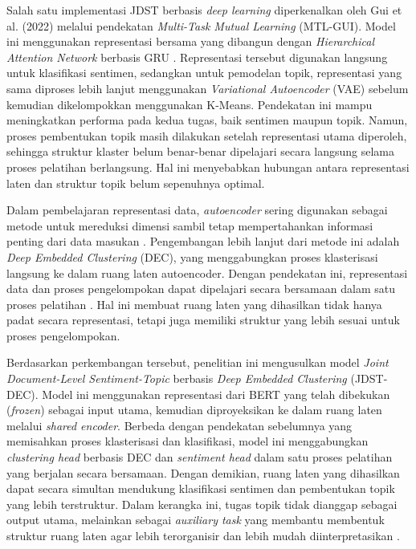 \bigskip

Salah satu implementasi JDST berbasis \textit{deep learning} diperkenalkan oleh
Gui et al. (2022) melalui pendekatan \textit{Multi-Task Mutual Learning}
(MTL-GUI). Model ini menggunakan representasi bersama yang dibangun dengan
\textit{Hierarchical Attention Network} berbasis GRU
\parencite{chung2014empirical}. Representasi tersebut digunakan langsung untuk
klasifikasi sentimen, sedangkan untuk pemodelan topik, representasi yang sama
diproses lebih lanjut menggunakan \textit{Variational Autoencoder} (VAE)
sebelum kemudian dikelompokkan menggunakan K-Means. Pendekatan ini mampu
meningkatkan performa pada kedua tugas, baik sentimen maupun topik. Namun,
proses pembentukan topik masih dilakukan setelah representasi utama diperoleh,
sehingga struktur klaster belum benar-benar dipelajari secara langsung selama
proses pelatihan berlangsung. Hal ini menyebabkan hubungan antara representasi
laten dan struktur topik belum sepenuhnya optimal.

\bigskip

Dalam pembelajaran representasi data, \textit{autoencoder} sering digunakan
sebagai metode untuk mereduksi dimensi sambil tetap mempertahankan informasi
penting dari data masukan \parencite{hinton2006reducing}. Pengembangan lebih
lanjut dari metode ini adalah \textit{Deep Embedded Clustering} (DEC), yang
menggabungkan proses klasterisasi langsung ke dalam ruang laten autoencoder.
Dengan pendekatan ini, representasi data dan proses pengelompokan dapat
dipelajari secara bersamaan dalam satu proses pelatihan
\parencite{xie2016unsupervised}. Hal ini membuat ruang laten yang dihasilkan
tidak hanya padat secara representasi, tetapi juga memiliki struktur yang lebih
sesuai untuk proses pengelompokan.

\bigskip

Berdasarkan perkembangan tersebut, penelitian ini mengusulkan model
\textit{Joint Document-Level Sentiment-Topic} berbasis
\textit{Deep Embedded Clustering} (JDST-DEC). Model ini menggunakan representasi
dari BERT yang telah dibekukan (\textit{frozen}) sebagai input utama, kemudian
diproyeksikan ke dalam ruang laten melalui \textit{shared encoder}. Berbeda
dengan pendekatan sebelumnya yang memisahkan proses klasterisasi dan
klasifikasi, model ini menggabungkan \textit{clustering head} berbasis DEC dan
\textit{sentiment head} dalam satu proses pelatihan yang berjalan secara
bersamaan. Dengan demikian, ruang laten yang dihasilkan dapat secara simultan
mendukung klasifikasi sentimen dan pembentukan topik yang lebih terstruktur.
Dalam kerangka ini, tugas topik tidak dianggap sebagai output utama, melainkan
sebagai \textit{auxiliary task} yang membantu membentuk struktur ruang laten
agar lebih terorganisir dan lebih mudah diinterpretasikan
\parencite{caruana1997multitask}.

